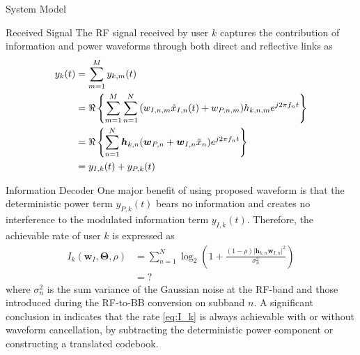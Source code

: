 \documentclass{IEEEtran}
\begin{document}
\begin{section} {System Model}
	\begin{subsection}	{Received Signal}
		The RF signal received by user $k$ captures the contribution of information and power waveforms through both direct and reflective links as
		\begin{equation}	\label{eq:y_{k}(t)}
			\begin{split}
				y_{k}(t)
				&=\sum_{m=1}^M{y_{k,m}(t)}	\\
				&=\Re\left\{\sum_{m=1}^M{\sum_{n=1}^N{(w_{I,n,m}\tilde{x}_{I,n}(t)+w_{P,n,m})h_{k,n,m}e^{j2{\pi}{f_n}t}}}\right\}	\\
				&=\Re\left\{\sum_{n=1}^N{\boldsymbol{h}_{k,n}(\boldsymbol{w}_{P,n}+\boldsymbol{w}_{I,n}\tilde{x}_n)e^{j2{\pi}{f_n}t}}\right\}	\\
				&=y_{I,k}(t)+y_{P,k}(t)
			\end{split}
		\end{equation}
	\end{subsection}

	\begin{subsection}	{Information Decoder}
		One major benefit of using proposed waveform is that the deterministic power term $y_{P,k}(t)$ bears no information and creates no interference to the modulated information term $y_{I,k}(t)$. Therefore, the achievable rate of user $k$ is expressed as
		\begin{equation}	\label{eq:I_k}
			\begin{split}
				I_k(\boldsymbol{w}_I,\boldsymbol{\Theta},\rho)
				&=\sum_{n=1}^N{\log_2\left(1+\frac{(1-\rho)\lvert\boldsymbol{h}_{k,n}\boldsymbol{w}_{I,n}\rvert^2}{\sigma_n^2}\right)}	\\
				&=?
			\end{split}
		\end{equation}
		where $\sigma_n^2$ is the sum variance of the Gaussian noise at the RF-band and those introduced during the RF-to-BB conversion on subband $n$. A significant conclusion in \cite{Clerckx2018b} indicates that the rate \ref{eq:I_k} is always achievable with or without waveform cancellation, by subtracting the deterministic power component or constructing a translated codebook.
	\end{subsection}


\end{section}
\end{document}

